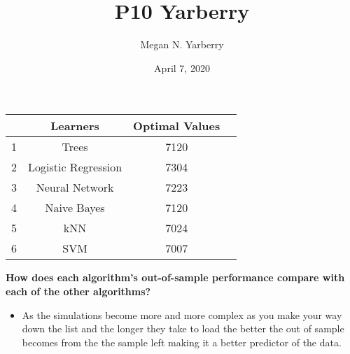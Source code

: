 \documentclass{article}
\title{P10 Yarberry}
\author{Megan N. Yarberry }
\date{April 7, 2020}
\begin{document}
\maketitle

\begin{center}
 \begin{tabular}{||c c c c||} 
 \hline
  & Learners & Optimal Values &\\ [1ex] 
 \hline\hline
 1 & Trees & 7120 &\\ [1ex]
 \hline
 2 & Logistic Regression & 7304 &\\ [1ex]
 \hline
 3 & Neural Network & 7223  &\\ [1ex]
 \hline
 4 & Naive Bayes & 7120 & \\ [1ex]
 \hline
 5 & kNN & 7024 &\\ [1ex]
 \hline 
 6 & SVM & 7007 &\\ [1ex] 
 \hline
\end{tabular}
\end{center}


\textbf{How does each algorithm’s out-of-sample performance compare
with each of the other algorithms?}
\begin{itemize}
\item As the simulations become more and more complex as you make your way down the list and the longer they take to load the better the out of sample becomes from the the sample left making it a better predictor of the data. 
\end{itemize}
\end{document}
